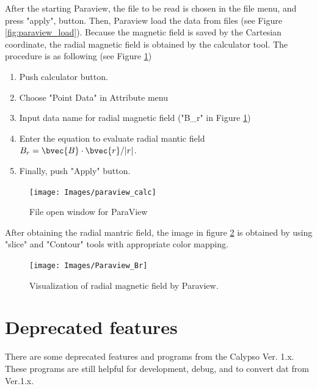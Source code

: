 After the starting Paraview, the file to be read is chosen in the file menu, and press "apply", button. Then, Paraview load the data from files (see Figure \ref{fig:paraview_load}). 
Because the magnetic field is saved by the Cartesian coordinate, the radial magnetic field is obtained by the calculator tool. The procedure is as following (see Figure \ref{fig:paraview_gen_Br})
%
\begin{enumerate}
\item Push calculator button.
\item Choose "Point Data" in Attribute menu
\item Input data name for radial magnetic field ("B\_r" in  Figure \ref{fig:paraview_gen_Br})
\item Enter the equation to evaluate radial mantic field $B_{r} = \bvec{B} \cdot \bvec{r} / |r|$.
\item Finally, push "Apply" button.
\end{enumerate}
%
%
\begin{figure}[htbp]
\begin{center}
\texttt{[image: Images/paraview\_calc]}
\caption{File open window for ParaView}
\label{fig:paraview_gen_Br}
\end{center}
\end{figure}
%
After obtaining the radial mantric field, the image in figure \ref{fig:paraview_br} is obtained by using "slice" and  "Contour" tools with appropriate color mapping.
%
\begin{figure}[htbp]
\begin{center}
\texttt{[image: Images/Paraview\_Br]}
\end{center}
\caption{Visualization of radial magnetic field by Paraview.}
\label{fig:paraview_br}
\end{figure}
%

\newpage
\section{Deprecated features}
There are some deprecated features and programs from the Calypso Ver. 1.x. These programs are still helpful for development, debug, and to convert dat from Ver.1.x.

